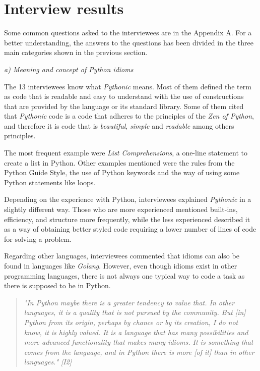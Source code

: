 \documentclass[a4paper]{article}
\begin{document}
\section{Interview results}

Some common questions asked to the interviewees are in the Appendix A. For a better understanding, the answers to the questions has been divided in the three main categories shown in the previous section.

\textit{a) Meaning and concept of Python idioms}

The 13 interviewees know what \textit{Pythonic} means. Most of them defined the term as code that is readable and easy to understand with the use of constructions that are provided by the language or its standard library.
Some of them cited that \textit{Pythonic} code is a code that adheres to the principles of the \textit{Zen of Python}, and therefore it is code that is \textit{beautiful}, \textit{simple} and \textit{readable} among others principles.

The most frequent example were \textit{List Comprehensions}, a one-line statement to create a list in Python. Other examples mentioned were the rules from the Python Guide Style, the use of Python keywords and the way of using some Python statements like loops.


Depending on the experience with Python, interviewees explained \textit{Pythonic} in a slightly different way. Those who are more experienced mentioned built-ins, efficiency, and structure more frequently, while the less experienced described it as a way of obtaining better styled code requiring a lower number of lines of code for solving a problem. 

Regarding other languages, interviewees commented that idioms can also be found in languages like \textit{Golang}. However, even though idioms exist in other programming languages, there is not always one typical way to code a task as there is supposed to be in Python.
\begin{quote}
\textit{
    "In Python maybe there is a greater tendency to value that. In other languages, it is a quality that is not pursued by the community. But [in] Python from its origin, perhaps by chance or by its creation, I do not know, it is highly valued. It is a language that has many possibilities and more advanced functionality that makes many idioms. It is something that comes from the language, and in Python there is more [of it] than in other languages." [I2]
}
\end{quote}
\end{document}

